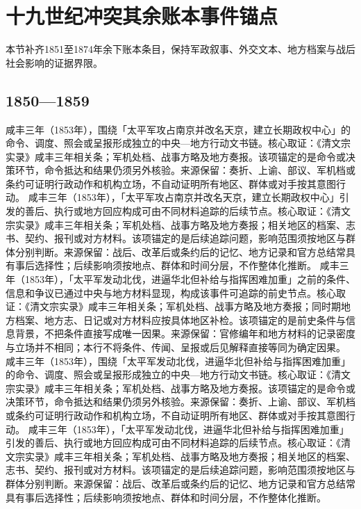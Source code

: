\section{十九世纪冲突其余账本事件锚点}
本节补齐1851至1874年余下账本条目，保持军政叙事、外交文本、地方档案与战后社会影响的证据界限。
\subsection{1850—1859}
咸丰三年（1853年），围绕「太平军攻占南京并改名天京，建立长期政权中心」的命令、调度、照会或呈报形成独立的中央—地方行动文书链。核心取证：《清文宗实录》咸丰三年相关条；军机处档、战事方略及地方奏报。该项锚定的是命令或决策环节，命令抵达和结果仍须另外核验。来源保留：奏折、上谕、部议、军机档或条约可证明行政动作和机构立场，不自动证明所有地区、群体或对手按其意图行动。
咸丰三年（1853年），「太平军攻占南京并改名天京，建立长期政权中心」引发的善后、执行或地方回应构成可由不同材料追踪的后续节点。核心取证：《清文宗实录》咸丰三年相关条；军机处档、战事方略及地方奏报；相关地区的档案、志书、契约、报刊或对方材料。该项锚定的是后续追踪问题，影响范围须按地区与群体分别判断。来源保留：战后、改革后或条约后的记忆、地方记录和官方总结常具有事后选择性；后续影响须按地点、群体和时间分层，不作整体化推断。
咸丰三年（1853年），「太平军发动北伐，进逼华北但补给与指挥困难加重」之前的条件、信息和争议已通过中央与地方材料显现，构成该事件可追踪的前史节点。核心取证：《清文宗实录》咸丰三年相关条；军机处档、战事方略及地方奏报；同时期地方档案、地方志、日记或对方材料应按具体地区补检。该项锚定的是前史条件与信息背景，不把条件直接写成唯一因果。来源保留：官修编年和地方材料的记录密度与立场并不相同；本行不将条件、传闻、呈报或后见解释直接等同为确定因果。
咸丰三年（1853年），围绕「太平军发动北伐，进逼华北但补给与指挥困难加重」的命令、调度、照会或呈报形成独立的中央—地方行动文书链。核心取证：《清文宗实录》咸丰三年相关条；军机处档、战事方略及地方奏报。该项锚定的是命令或决策环节，命令抵达和结果仍须另外核验。来源保留：奏折、上谕、部议、军机档或条约可证明行政动作和机构立场，不自动证明所有地区、群体或对手按其意图行动。
咸丰三年（1853年），「太平军发动北伐，进逼华北但补给与指挥困难加重」引发的善后、执行或地方回应构成可由不同材料追踪的后续节点。核心取证：《清文宗实录》咸丰三年相关条；军机处档、战事方略及地方奏报；相关地区的档案、志书、契约、报刊或对方材料。该项锚定的是后续追踪问题，影响范围须按地区与群体分别判断。来源保留：战后、改革后或条约后的记忆、地方记录和官方总结常具有事后选择性；后续影响须按地点、群体和时间分层，不作整体化推断。
